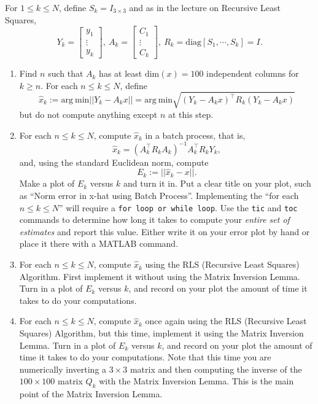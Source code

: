 \documentclass[letterpaper]{article}
\begin{document}
\begin{enumerate}
For $1 \le k \le N$, define $S_k=I_{3 \times 3}$ and as in the lecture on Recursive Least Squares, $$ Y_k =\left[ \begin{array}{c} y_1 \\ \vdots \\ y_k \end{array} \right],~   A_k = \left[ \begin{array}{c} C_1 \\ \vdots \\ C_k  \end{array}  \right], ~ R_k = \mathrm{diag} [S_1, \cdots, S_k] = I.$$


\begin{enumerate}
\setlength{\itemsep}{.1in}
\renewcommand{\labelenumi}{(\alph{enumi})}

\item Find $n$ such that $A_k$ has at least $\mathrm{dim}(x)=100$  independent columns for $k\ge n$. For each $n \le k \le N$, define
$$ \hat{x}_k :=\mathrm{arg~min} ||Y_k - A_k x ||=\mathrm{arg~min} \sqrt{(Y_k - A_k x)^\top R_k(Y_k - A_k x)}$$
but do not compute anything except $n$ at this step.

\item For each $n \le k \le N$, compute $ \hat{x}_k $ in a batch process, that is,
$$  \hat{x}_k  = (A_k^\top R_kA_k)^{-1} A_k^\top R_k Y_k, $$
and, using the standard Euclidean norm, compute $$E_k :=||  \hat{x}_k  - x||.$$ Make a plot of $E_k$ versus $k$ and turn it in. Put a clear title on your plot, such as ``Norm error in x-hat using Batch Process''. Implementing the ``for each $n \le k \le N$'' will require a \texttt{for loop or while loop}. Use the \texttt{tic} and \texttt{toc} commands to determine how long it takes to compute your \textit{entire set of estimates} and report this value. Either write it on your error plot by hand or place it there with a MATLAB command.

\item For each $n \le k \le N$, compute $ \hat{x}_k $ using the RLS (Recursive Least Squares) Algorithm. First implement it without using the Matrix Inversion Lemma. Turn in a plot of $E_k$ versus $k$, and record on your plot the amount of time it takes to do your computations.

    \item For each $n \le k \le N$, compute $ \hat{x}_k $ once again using the RLS (Recursive Least Squares) Algorithm, but this time, implement it using the Matrix Inversion Lemma. Turn in a plot of $E_k$ versus $k$, and record on your plot the amount of time it takes to do your computations. Note that this time you are numerically inverting a $3 \times 3$ matrix and then computing the inverse of the $100 \times 100$ matrix $Q_k$ with the Matrix Inversion Lemma. This is the main point of the Matrix Inversion Lemma.


\end{enumerate}
\end{enumerate}
\end{document}

